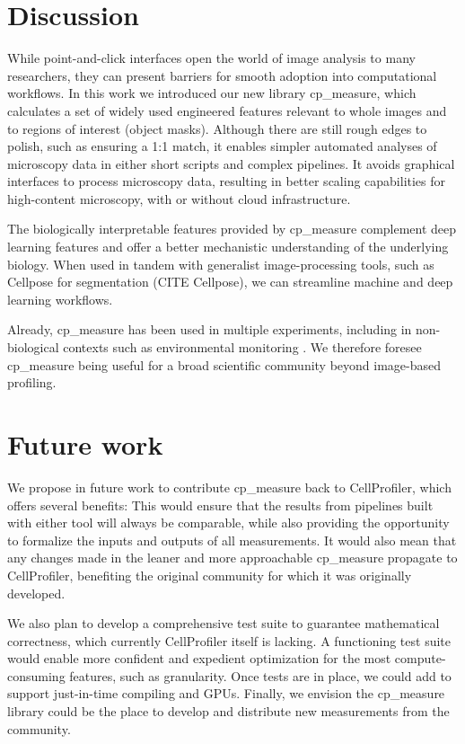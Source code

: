 \documentclass{article}
\begin{document}
\section{Discussion}
\label{sec:orgf37b369}
While point-and-click interfaces open the world of image analysis to many researchers, they can present barriers for smooth adoption into computational workflows. In this work we introduced our new library cp\_measure, which calculates a set of widely used engineered features relevant to whole images and to regions of interest (object masks). Although there are still rough edges to polish, such as ensuring a 1:1 match, it enables simpler automated analyses of microscopy data in either short scripts and complex pipelines. It avoids graphical interfaces to process microscopy data, resulting in better scaling capabilities for high-content microscopy, with or without cloud infrastructure.

The biologically interpretable features provided by cp\_measure complement deep learning features and offer a better mechanistic understanding of the underlying biology. When used in tandem with generalist image-processing tools, such as Cellpose for segmentation (CITE Cellpose), we can streamline machine and deep learning workflows. 

Already, cp\_measure  has been used in multiple experiments, including in non-biological contexts such as environmental monitoring \citep{ideharaExploringNileRed2025}. We therefore foresee cp\_measure being useful for a broad scientific community beyond image-based profiling.
\section{Future work}
\label{sec:org5cdbb12}
We propose in future work to contribute cp\_measure back to CellProfiler, which offers several benefits: This would ensure that the results from pipelines built with either tool will always be comparable, while also providing the opportunity to formalize the inputs and outputs of all measurements. It would also mean that any changes made in the leaner and more approachable cp\_measure propagate to CellProfiler, benefiting the original community for which it was originally developed.

We also plan to develop a comprehensive test suite to guarantee mathematical correctness, which currently CellProfiler itself is lacking. A functioning test suite would enable more confident and expedient optimization for the most compute-consuming features, such as granularity. Once tests are in place, we could add to support just-in-time compiling and GPUs. Finally, we envision the cp\_measure library could be the place to develop and distribute new measurements from the community. 
\end{document}
